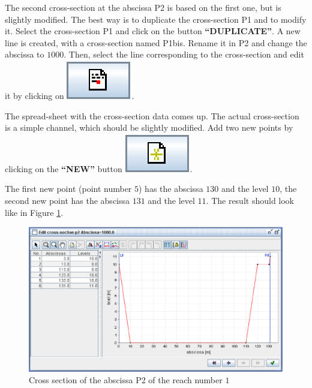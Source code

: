 \documentclass[a4paper,12pt]{article}
\begin{document}
The second cross-section at the abscissa P2 is based on the first
one, but is slightly modified. The best way is to duplicate the cross-section
P1 and to modify it. Select the cross-section P1 and click on the
button \textbf{{}``DUPLICATE''}. A new line is created, with a cross-section
named P1bis. Rename it in P2 and change the abscissa to $1000$. Then,
select the line corresponding to the cross-section and edit it by
clicking on \includegraphics[scale=0.6]{edit}.

\vspace{0.5cm}

The spread-sheet with the cross-section data comes up. The actual
cross-section is a simple channel, which should be slightly modified.
Add two new points by clicking on the \textbf{{}``NEW''} button
\includegraphics[scale=0.6]{new}.

\vspace{0.5cm}

The first new point (point number $5$) has the abscissa $130$ and the
level $10$, the second new point has the abscissa $131$ and the level
$11$. The result should look like in Figure \ref{fig:CS_P2}. 

\newpage

\begin{figure}[h]
  \begin{center}
  \includegraphics[scale=0.5]{CS_R1_P2}
  \caption{Cross section of the abscissa P2 of the reach number $1$}
  \label{fig:CS_P2}
  \end{center}
\end{figure}
\end{document}
